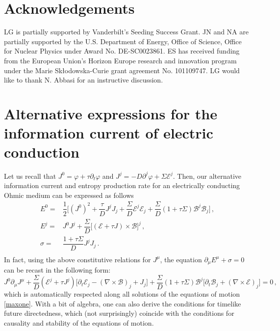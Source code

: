 \documentclass[a4paper, amsfonts, amssymb, amsmath, reprint, showkeys, nofootinbib, twoside,notitlepage,onecolumn,preprintnumbers]{revtex4-2}
\theoremstyle{definition}
\theoremstyle{theorem}
\theoremstyle{corollary}
\begin{document}
\section*{Acknowledgements}

LG is partially supported by Vanderbilt's Seeding Success Grant. JN and NA are partially supported by the U.S. Department of Energy, Office of Science, Office for Nuclear Physics
under Award No.  DE-SC0023861. ES has received funding from the European Union’s Horizon Europe research and innovation program under the Marie Sk\l odowska-Curie grant agreement No. 101109747. LG would like to thank N. Abbasi for an instructive discussion.



\appendix

\section{Alternative expressions for the information current of electric conduction}\label{AAA}

Let us recall that $J^0=\varphi+\tau \partial_t \varphi$ and $J^j=-D\partial^j \varphi+\Sigma \mathcal{E}^j$. Then, our alternative information current and entropy production rate for an electrically conducting Ohmic medium can be expressed as follows
\begin{equation}
    \begin{split}
E^0={}& \dfrac{1}{2} \bigg[ (J^0)^2+\dfrac{\tau}{D} J^j J_j+ \dfrac{\Sigma}{D} \mathcal{E}^j \mathcal{E}_j + \dfrac{\Sigma}{D} (1+\tau \Sigma)\mathcal{B}^j\mathcal{B}_j \bigg] \, , \\
E^j={}& J^0 J^j + \dfrac{\Sigma}{D} \big[(\mathcal{E}+\tau J) \times \mathcal{B} \big]^j \, , \\
\sigma ={}&  \dfrac{1+\tau \Sigma}{D} J^j J_j \, . \\
    \end{split}
\end{equation}
In fact, using the above constitutive relations for $J^\mu$, the equation $\partial_\mu E^\mu+\sigma=0$ can be recast in the following form:
\begin{equation}
    J^0 \partial_\mu J^\mu +\dfrac{\Sigma}{D} (\mathcal{E}^j{+}\tau J^j)\big[ \partial_t \mathcal{E}_j -(\nabla {\times} \mathcal{B})_j +J_j \big] +\dfrac{\Sigma}{D} (1{+}\tau \Sigma)\mathcal{B}^j \big[\partial_t \mathcal{B}_j + (\nabla {\times} \mathcal{E})_j \big] =0 \, ,
\end{equation}
which is automatically respected along all solutions of the equations of motion \eqref{maxone}. With a bit of algebra, one can also derive the conditions for timelike future directedness, which (not surprisingly) coincide with the conditions for causality and stability of the equations of motion.
\end{document}
